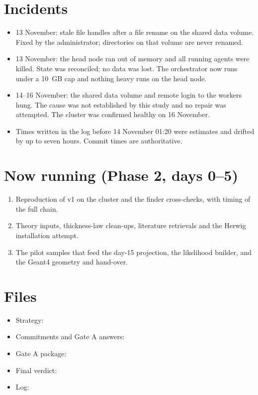 \documentclass[11pt,a4paper]{article}
\begin{document}
\section{Incidents}
\begin{itemize}
\item 13 November: stale file handles after a file rename on the shared data volume. Fixed by the administrator;
      directories on that volume are never renamed.
\item 13 November: the head node ran out of memory and all running agents were killed. State was reconciled; no
      data was lost. The orchestrator now runs under a 10~GB cap and nothing heavy runs on the head node.
\item 14--16 November: the shared data volume and remote login to the workers hung. The cause was not established
      by this study and no repair was attempted. The cluster was confirmed healthy on 16 November.
\item Times written in the log before 14 November 01:20 were estimates and drifted by up to seven hours. Commit
      times are authoritative.
\end{itemize}

\section{Now running (Phase 2, days 0--5)}
\begin{enumerate}
\item Reproduction of v1 on the cluster and the finder cross-checks, with timing of the full chain.
\item Theory inputs, thickness-law clean-ups, literature retrievals and the Herwig installation attempt.
\item The pilot samples that feed the day-15 projection, the likelihood builder, and the Geant4 geometry and
      hand-over.
\end{enumerate}

\section*{Files}
\begin{itemize}
\item Strategy: 
\item Commitments and Gate A answers: 
\item Gate A package: 
\item Final verdict: 
\item Log: 
\end{itemize}
\end{document}

